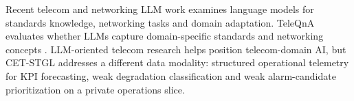 Recent telecom and networking LLM work examines language models for standards knowledge, networking tasks and domain adaptation. TeleQnA evaluates whether LLMs capture domain-specific standards and networking concepts \cite{maatouk2026teleqna}. LLM-oriented telecom research helps position telecom-domain AI, but CET-STGL addresses a different data modality: structured operational telemetry for KPI forecasting, weak degradation classification and weak alarm-candidate prioritization on a private operations slice.
